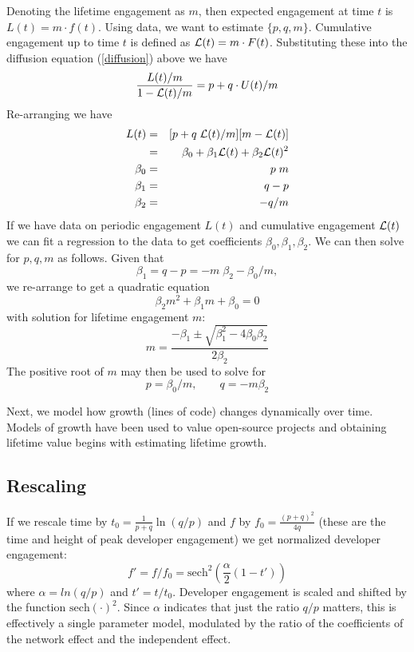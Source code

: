 \documentclass[conference]{IEEEtran}
\begin{document}
Denoting the lifetime engagement as $m$, then expected engagement at time $t$ is $L(t)=m \cdot f(t)$. Using data, we want to estimate $\{p,q,m\}$. Cumulative engagement up to time $t$ is defined as ${\cal L}(t)=m \cdot F(t)$. Substituting these into the diffusion equation (\ref{diffusion}) above we have 
\begin{equation}
\frac{L(t)/m}{1-{\cal L}(t)/m} = p + q \cdot U(t)/m
\end{equation}
Re-arranging we have
\begin{eqnarray}
L(t) &=& [p+q \; {\cal L}(t)/m][m-{\cal L}(t)] \nonumber \\
 &=& \beta_0 + \beta_1 {\cal L}(t) + \beta_2 {\cal L}(t)^2 \\
\beta_0 &=& p\; m \\
\beta_1 &=& q-p \\
\beta_2 &=& -q/m
\end{eqnarray}
If we have data on periodic engagement $L(t)$ and cumulative engagement ${\cal L}(t)$ we can fit a regression to the data to get coefficients $\beta_0, \beta_1, \beta_2$. We can then solve for $p,q,m$ as follows. Given that
\begin{equation}
\beta_1 = q-p = -m\; \beta_2 - \beta_0/m,
\end{equation}
we re-arrange to get a quadratic equation
\begin{equation}
\beta_2 m^2 + \beta_1 m + \beta_0 = 0
\end{equation}
with solution for lifetime engagement $m$:
\begin{equation}
m = \frac{-\beta_1 \pm \sqrt{\beta_1^2 - 4 \beta_0 \beta_2}}{2 \beta_2}
\end{equation}
The positive root of $m$ may then be used to solve for 
\begin{equation}
p = \beta_0/m,  \quad \quad q = -m \beta_2
\end{equation}

Next, we model how growth (lines of code) changes dynamically over time. Models of growth have been used to value open-source projects \citep{horowitz_software_2001, hoffmann_value_2024} and obtaining lifetime value begins with estimating lifetime growth. 

\subsection{Rescaling}
\label{sec:rescaling}

If we rescale time by $t_0 = \frac{1}{p+q} \ln(q/p)$ and $f$ by $f_0 = \frac{(p+q)^2}{4q}$ (these are the time and height of peak developer engagement) we get normalized developer engagement:
$$
f' = f/f_0 = \mbox{sech}^2 \left( \frac{\alpha}{2} (1 - t') \right)
$$
where $\alpha = ln(q/p)$ and $t' = t/t_0$. Developer engagement is scaled and shifted by the function $\mbox{sech}(\cdot)^2$. Since $\alpha$ indicates that just the ratio $q/p$ matters, this is effectively a single parameter model, modulated by the ratio of the coefficients of the network effect and the independent effect. 
\end{document}
